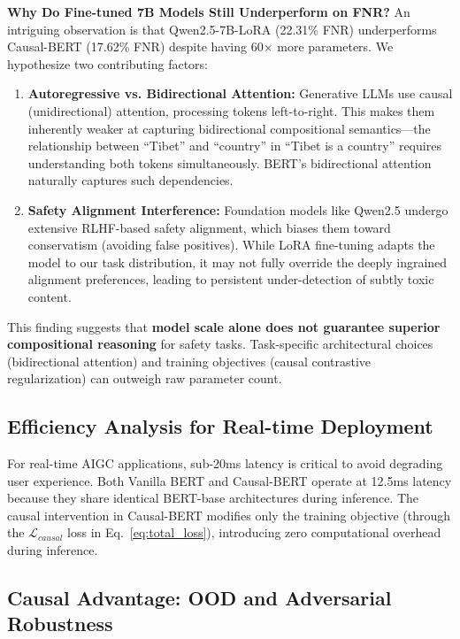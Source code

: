 \documentclass{acmart}
\begin{document}
\textbf{Why Do Fine-tuned 7B Models Still Underperform on FNR?} An intriguing observation is that Qwen2.5-7B-LoRA (22.31\% FNR) underperforms Causal-BERT (17.62\% FNR) despite having 60$\times$ more parameters. We hypothesize two contributing factors:

\begin{enumerate}
\item \textbf{Autoregressive vs. Bidirectional Attention:} Generative LLMs use causal (unidirectional) attention, processing tokens left-to-right. This makes them inherently weaker at capturing bidirectional compositional semantics---the relationship between ``Tibet'' and ``country'' in ``Tibet is a country'' requires understanding both tokens simultaneously. BERT's bidirectional attention naturally captures such dependencies.

\item \textbf{Safety Alignment Interference:} Foundation models like Qwen2.5 undergo extensive RLHF-based safety alignment, which biases them toward conservatism (avoiding false positives). While LoRA fine-tuning adapts the model to our task distribution, it may not fully override the deeply ingrained alignment preferences, leading to persistent under-detection of subtly toxic content.
\end{enumerate}

This finding suggests that \textbf{model scale alone does not guarantee superior compositional reasoning} for safety tasks. Task-specific architectural choices (bidirectional attention) and training objectives (causal contrastive regularization) can outweigh raw parameter count.

\subsection{Efficiency Analysis for Real-time Deployment}
\label{subsec:efficiency}

For real-time AIGC applications, sub-20ms latency is critical to avoid degrading user experience. Both Vanilla BERT and Causal-BERT operate at 12.5ms latency because they share identical BERT-base architectures during inference. The causal intervention in Causal-BERT modifies only the training objective (through the $\mathcal{L}_{causal}$ loss in Eq.~\ref{eq:total_loss}), introducing zero computational overhead during inference.

\subsection{Causal Advantage: OOD and Adversarial Robustness}
\label{subsec:causal_advantage}
\end{document}
